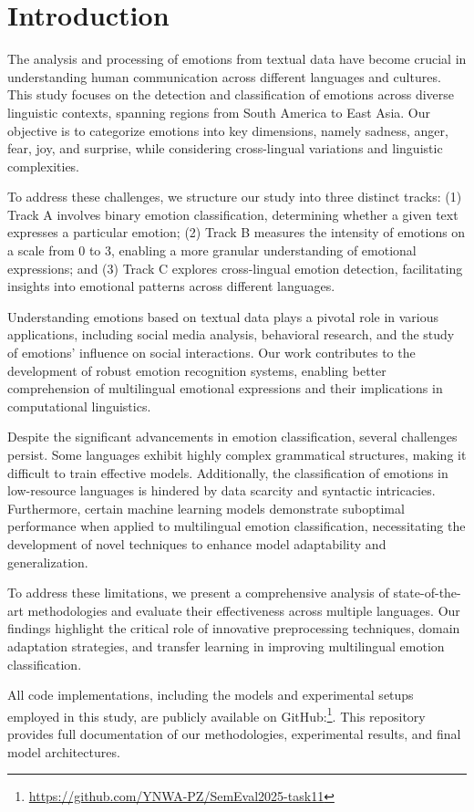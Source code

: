 \section{Introduction}
The analysis and processing of emotions from textual data have become crucial in understanding human communication across different languages and cultures. This study focuses on the detection and classification of emotions across diverse linguistic contexts, spanning regions from South America to East Asia. Our objective is to categorize emotions into key dimensions, namely sadness, anger, fear, joy, and surprise, while considering cross-lingual variations and linguistic complexities.

To address these challenges, we structure our study into three distinct tracks: (1) Track A involves binary emotion classification, determining whether a given text expresses a particular emotion; (2) Track B measures the intensity of emotions on a scale from 0 to 3, enabling a more granular understanding of emotional expressions; and (3) Track C explores cross-lingual emotion detection, facilitating insights into emotional patterns across different languages.

Understanding emotions based on textual data plays a pivotal role in various applications, including social media analysis, behavioral research, and the study of emotions' influence on social interactions. Our work contributes to the development of robust emotion recognition systems, enabling better comprehension of multilingual emotional expressions and their implications in computational linguistics.

Despite the significant advancements in emotion classification, several challenges persist. Some languages exhibit highly complex grammatical structures, making it difficult to train effective models. Additionally, the classification of emotions in low-resource languages is hindered by data scarcity and syntactic intricacies. Furthermore, certain machine learning models demonstrate suboptimal performance when applied to multilingual emotion classification, necessitating the development of novel techniques to enhance model adaptability and generalization.

To address these limitations, we present a comprehensive analysis of state-of-the-art methodologies and evaluate their effectiveness across multiple languages. Our findings highlight the critical role of innovative preprocessing techniques, domain adaptation strategies, and transfer learning in improving multilingual emotion classification.

All code implementations, including the models and experimental setups employed in this study, are publicly available on GitHub:\footnote{\url{https://github.com/YNWA-PZ/SemEval2025-task11}}. This repository provides full documentation of our methodologies, experimental results, and final model architectures.